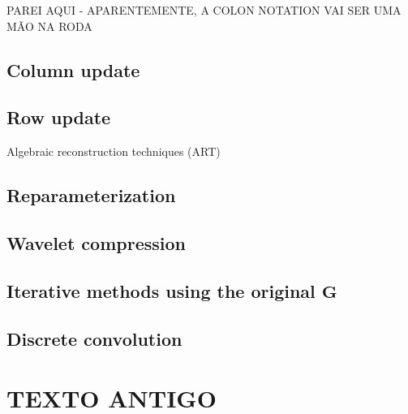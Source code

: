 PAREI AQUI - APARENTEMENTE, A COLON NOTATION VAI SER UMA MÃO NA RODA

\subsection{Column update}

\cite{cordell1992}

\cite{guspi-novara2009}

\subsection{Row update}

Algebraic reconstruction techniques (ART) \cite{sluis-vorst1987}

\cite{mendonca-silva1994}

\subsection{Reparameterization}

\cite{barnes-lumley_2011}

\cite{oliveirajr-etal2013}

\cite{mendonca-2020}

\subsection{Wavelet compression}

\cite{li-oldenburg_2010}

\subsection{Iterative methods using the original $\mathbf{G}$}

\cite{xia-sprowl1991}

\cite{xia-etal1993}

\cite{siqueira-etal2017}

\cite{jirigalatu-ebbing2019}


\subsection{Discrete convolution}

\cite{takahashi-etal2020}

\cite{takahashi-etal2022}

\section{TEXTO ANTIGO}

